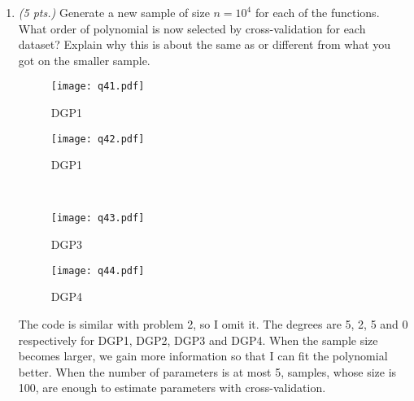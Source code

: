 \documentclass[11pt,english]{article}
\begin{document}
\begin{enumerate}
    \item \textit{(5 pts.)} Generate a new sample of size $n = 10^4$ for each of the functions. What order of polynomial is now selected by cross-validation for each dataset? Explain why this is about the same as or different from what you got on the smaller sample.

\begin{figure}[H]
\begin{minipage}[t]{0.5\linewidth}
\centering
\texttt{[image: q41.pdf]}
\caption{DGP1}
\end{minipage}%
\begin{minipage}[t]{0.5\linewidth}
\centering
\texttt{[image: q42.pdf]}
\caption{DGP1}
\end{minipage} \\
\begin{minipage}[t]{0.5\linewidth}
\centering
\texttt{[image: q43.pdf]}
\caption{DGP3}
\end{minipage}%
\begin{minipage}[t]{0.5\linewidth}
\centering
\texttt{[image: q44.pdf]}
\caption{DGP4}
\end{minipage}
\end{figure}
The code is similar with problem 2, so I omit it.  The degrees are 5, 2, 5 and 0 respectively for DGP1, DGP2, DGP3 and DGP4.  When the sample size becomes larger, we gain more information so that I can fit the polynomial better.  When the number of parameters is at most 5, samples, whose size is 100, are enough to estimate parameters with cross-validation.
    \end{enumerate}
\end{document}
